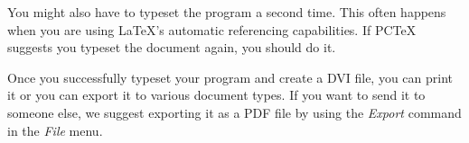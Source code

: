 \documentclass[titlepage]{article}                %
\theoremstyle{definition}
\theoremstyle{remark}
\begin{document}
You might also have to typeset the program a second time.  This often happens
when you are using \LaTeX{}'s automatic referencing capabilities.  If PCTeX
suggests you typeset the document again, you should do it.

Once you successfully typeset your program and create a DVI file, you can
print it or you can export it to various document types.  If you want to send
it to someone else, we suggest exporting it as a PDF file by using the
\emph{Export} command in the \emph{File} menu.

%
%
%
%
%
\end{document}
